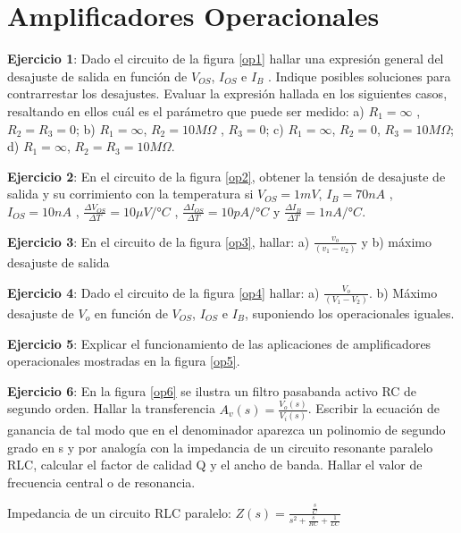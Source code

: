 \chapter{Amplificadores Operacionales}
 
 
 \hspace{10pt} \textbf{ Ejercicio 1}:  Dado el circuito de la figura \ref{op1} hallar una expresión general del desajuste de salida en función de $V_{OS}$, $I_{OS}$  e $I_B$ . Indique posibles soluciones para contrarrestar los desajustes. Evaluar la
expresión hallada en los siguientes casos, resaltando en ellos cuál es el parámetro que puede ser
medido: a)  $R_1 =\infty$   , $R_2 = R_3 = 0$; b)  $R_1 =\infty$, $R_2 = 10 M\Omega$ , $R_3 =
0$; c)  $R_1 = \infty$, $R_2 = 0$, $R_3 = 10 M\Omega$; d)  $R_1 = \infty$, $R_2 = R_3 = 10 M\Omega$.



\textbf{Ejercicio 2}: En el circuito de la figura \ref{op2}, obtener
la tensión de desajuste de salida y su corrimiento con la
temperatura si $V_{OS} = 1 mV$, $I_B = 70 nA$ , $I_{OS} = 10 nA$ ,
$\displaystyle \frac{\Delta V_{OS}}{\Delta T}= 10 \mu V/°C$ ,
$\displaystyle \frac{\Delta I_{OS}}{\Delta T}= 10 pA/°C$ y
$\displaystyle \frac{\Delta I_{B}}{\Delta T}= 1  nA/°C$.



\textbf{Ejercicio 3}: En el circuito de la figura \ref{op3}, hallar:
a)  $\displaystyle \frac{v_o}{(v_1-v_2)}$ y b)  máximo desajuste de
salida



\textbf{Ejercicio 4}: Dado el circuito de la figura \ref{op4}
hallar: a) $\displaystyle \frac{V_o}{(V_1-V_2)}$. b) Máximo
desajuste de $V_o$ en función de $V_{OS}$, $I_{OS}$ e $I_B$,
suponiendo los operacionales iguales.



\textbf{Ejercicio 5}:  Explicar el funcionamiento de las
aplicaciones de amplificadores operacionales mostradas en la figura
\ref{op5}.


\textbf{Ejercicio 6}: En la figura \ref{op6} se ilustra un filtro
pasabanda activo RC de segundo orden. Hallar la transferencia
$A_v(s)=\displaystyle \frac{V_o(s)}{V_i(s)}$. Escribir la ecuación
de ganancia de tal modo que en el denominador aparezca un polinomio
de segundo grado en s y por analogía con la impedancia de un
circuito resonante paralelo RLC, calcular el factor de calidad Q y
el ancho de banda. Hallar el valor de frecuencia central o de
resonancia.

Impedancia de un circuito RLC paralelo: $Z(s)=\displaystyle
\frac{\displaystyle \frac{s}{C}}{s^2+\displaystyle
	\frac{s}{RC}+\displaystyle \frac{1}{LC}}$


